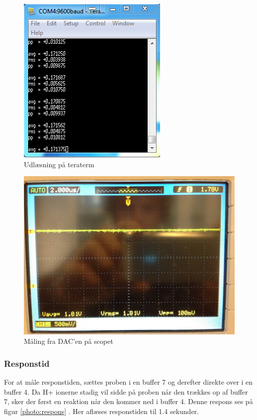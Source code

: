  \begin{figure}[H]
	\centering 
	\includegraphics[scale=1]{HardwareArkitektur/Sensore/pH_probe_billeder/stoj_teraterm.png}
	\caption{Udlæsning på teraterm}
	\label{photo:stoj_teraterm}
\end{figure} 

 \begin{figure}[H]
	\centering 
	\includegraphics[scale=0.9]{HardwareArkitektur/Sensore/pH_probe_billeder/stoj_oscilloscope.png}
	\caption{Måling fra DAC'en på scopet}
	\label{photo:stoj_scope}
\end{figure} 

\subsubsection{Responstid}
For at måle responstiden, sættes proben i en buffer 7 og derefter direkte over i en buffer 4. Da H+ ionerne stadig vil sidde på proben når den trækkes op af buffer 7, sker der først en reaktion når den kommer ned i buffer 4.  Denne respons ses på figur \ref{photo:respons} . Her aflæses responstiden til 1.4 sekunder.

